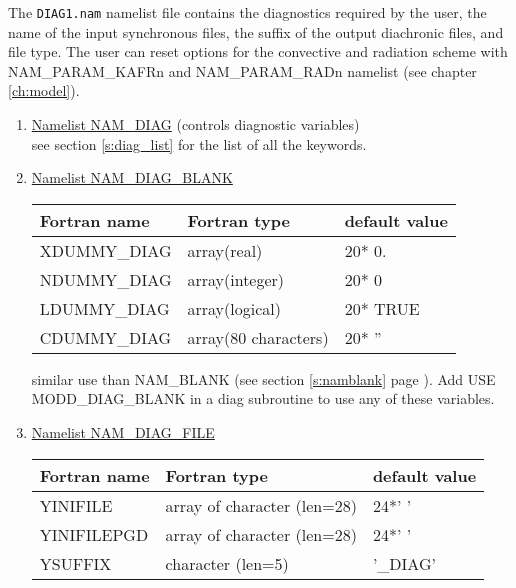 The {\tt DIAG1.nam} namelist file contains the diagnostics required
by the user, the name of the input synchronous files, the suffix of the
output diachronic files, and file type. The user can reset
options for the convective and radiation scheme with
NAM\_PARAM\_KAFRn and NAM\_PARAM\_RADn namelist  (see chapter
\ref{ch:model}).
\begin{enumerate}
\item\underline{Namelist NAM\_DIAG} (controls diagnostic variables)\\

see section \ref{s:diag_list} for the list of all the keywords.

\item\underline{Namelist NAM\_DIAG\_BLANK}
\begin{center}
\begin{tabular} {|l|l|l|}
\hline
Fortran name & Fortran type & default value \\
\hline
XDUMMY\_DIAG \index{XDUMMY\_DIAG!\innam{NAM\_DIAG\_BLANK}}  & array(real)          & 20* 0.   \\
NDUMMY\_DIAG \index{NDUMMY\_DIAG!\innam{NAM\_DIAG\_BLANK}}  & array(integer)       & 20* 0    \\
LDUMMY\_DIAG \index{LDUMMY\_DIAG!\innam{NAM\_DIAG\_BLANK}}  & array(logical)       & 20* TRUE \\
CDUMMY\_DIAG \index{CDUMMY\_DIAG!\innam{NAM\_DIAG\_BLANK}}  & array(80 characters) & 20* ''   \\
\hline
\end{tabular}
\end{center}
similar use than NAM\_BLANK (see section \ref{s:namblank} page \pageref{s:namblank}).
Add USE MODD\_DIAG\_BLANK in a diag subroutine to use
any of these variables.

\item\underline{Namelist NAM\_DIAG\_FILE} 
\begin{center}
\begin{tabular} {|l|l|l|}
\hline
Fortran name & Fortran type & default value\\
\hline
\hline
YINIFILE     & array of character (len=28)  & 24*' '   \\
YINIFILEPGD  & array of character (len=28)  & 24*' '   \\
YSUFFIX      & character (len=5)  & '\_DIAG'   \\
\hline
\end{tabular}
\end{center}


\end{enumerate}
